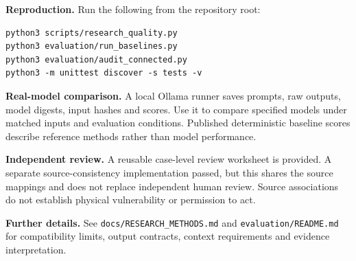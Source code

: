 \textbf{Reproduction.} Run the following from the repository root:
\begin{Verbatim}[fontsize=\small,breaklines=true]
python3 scripts/research_quality.py
python3 evaluation/run_baselines.py
python3 evaluation/audit_connected.py
python3 -m unittest discover -s tests -v
\end{Verbatim}

\textbf{Real-model comparison.} A local Ollama runner saves prompts, raw outputs, model digests, input hashes and scores. Use it to compare specified models under matched inputs and evaluation conditions. Published deterministic baseline scores describe reference methods rather than model performance.

\textbf{Independent review.} A reusable case-level review worksheet is provided. A separate source-consistency implementation passed, but this shares the source mappings and does not replace independent human review. Source associations do not establish physical vulnerability or permission to act.

\textbf{Further details.} See \texttt{docs/RESEARCH\_METHODS.md} and \texttt{evaluation/README.md} for compatibility limits, output contracts, context requirements and evidence interpretation.
